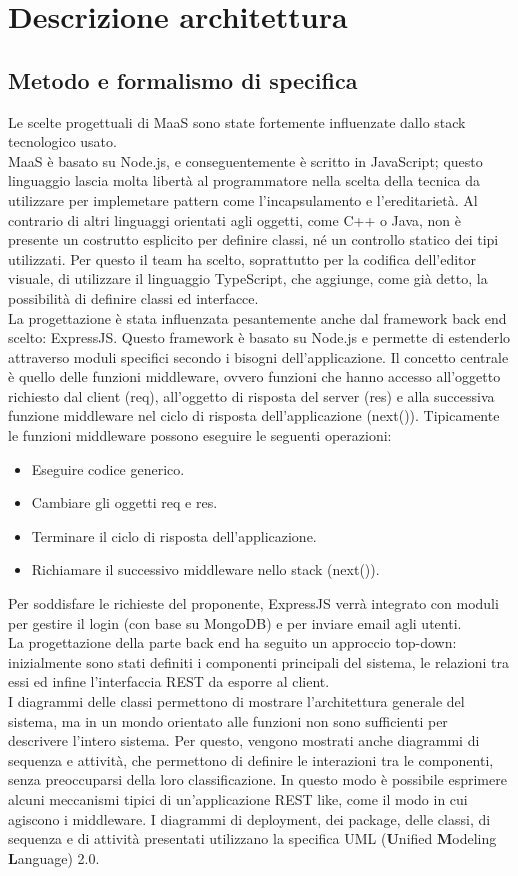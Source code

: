\newpage
\section{Descrizione architettura}
\subsection{Metodo e formalismo di specifica}
Le scelte progettuali di MaaS sono state fortemente influenzate dallo stack tecnologico usato. \\
MaaS è basato su Node.js, e conseguentemente è scritto in JavaScript; questo linguaggio lascia molta libertà al programmatore nella scelta della tecnica da utilizzare per implemetare pattern come l'incapsulamento e l'ereditarietà. Al contrario di altri linguaggi orientati agli oggetti, come C++ o Java, non è presente un costrutto esplicito per definire classi, né un controllo statico dei tipi utilizzati. Per questo il team ha scelto, soprattutto per la codifica dell'editor visuale, di utilizzare il linguaggio TypeScript, che aggiunge, come già detto, la possibilità di definire classi ed interfacce. \\
La progettazione è stata influenzata pesantemente anche dal framework back end scelto: ExpressJS. Questo framework è basato su Node.js e permette di estenderlo attraverso moduli specifici secondo i bisogni dell'applicazione. Il concetto centrale è quello delle funzioni middleware, ovvero funzioni che hanno accesso all'oggetto richiesto dal client (req), all'oggetto di risposta del server (res) e alla successiva funzione middleware nel ciclo di risposta dell'applicazione (next()). Tipicamente le funzioni middleware possono eseguire le seguenti operazioni:
\begin{itemize}
\item Eseguire codice generico.
\item Cambiare gli oggetti req e res.
\item Terminare il ciclo di risposta dell'applicazione.
\item Richiamare il successivo middleware nello stack (next()).
\end{itemize}
Per soddisfare le richieste del proponente, ExpressJS verrà integrato con moduli per gestire il login (con base su MongoDB) e per inviare email agli utenti. \\
La progettazione della parte back end ha seguito un approccio top-down: inizialmente sono stati definiti i componenti principali del sistema, le relazioni tra essi ed infine l'interfaccia REST da esporre al client. \\
I diagrammi delle classi permettono di mostrare l'architettura generale del sistema, ma in un mondo orientato alle funzioni non sono sufficienti per descrivere l'intero sistema. Per questo, vengono mostrati anche diagrammi di sequenza e attività, che permettono di definire le interazioni tra le componenti, senza preoccuparsi della loro classificazione. In questo modo è possibile esprimere alcuni meccanismi tipici di un'applicazione REST like, come il modo in cui agiscono i middleware. 
I diagrammi di deployment, dei package, delle classi, di sequenza e di attività presentati utilizzano la specifica UML (\textbf{U}nified \textbf{M}odeling \textbf{L}anguage) 2.0.
